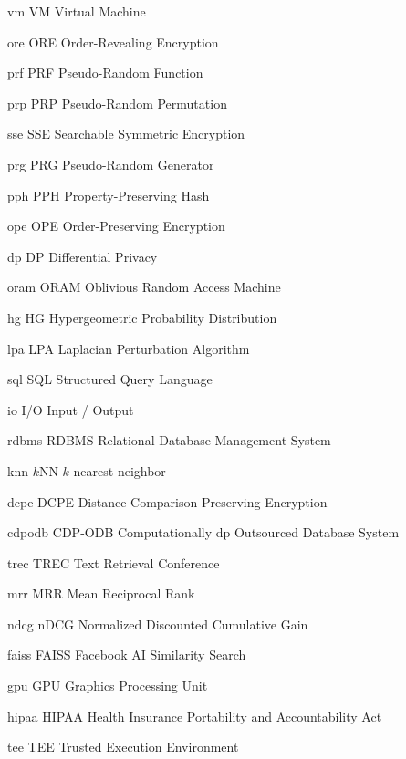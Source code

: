 
\newacronym%
	{vm}
	{VM}
	{Virtual Machine}

\newacronym%
	{ore}
	{ORE}
	{Order-Revealing Encryption}

\newacronym%
	{prf}
	{PRF}
	{Pseudo-Random Function}

\newacronym%
	{prp}
	{PRP}
	{Pseudo-Random Permutation}

\newacronym%
	{sse}
	{SSE}
	{Searchable Symmetric Encryption}

\newacronym%
	{prg}
	{PRG}
	{Pseudo-Random Generator}

\newacronym%
	{pph}
	{PPH}
	{Property-Preserving Hash}

\newacronym%
	{ope}
	{OPE}
	{Order-Preserving Encryption}

\newacronym%
	{dp}
	{DP}
	{Differential Privacy}

\newacronym%
	{oram}
	{ORAM}
	{Oblivious Random Access Machine}

\newacronym%
	{hg}
	{HG}
	{Hypergeometric Probability Distribution}

\newacronym%
	{lpa}
	{LPA}
	{Laplacian Perturbation Algorithm}

\newacronym%
	{sql}
	{SQL}
	{Structured Query Language}

\newacronym%
	{io}
	{I/O}
	{Input / Output}

\newacronym%
	{rdbms}
	{RDBMS}
	{Relational Database Management System}

\newacronym%
	{knn}
	{\ensuremath{k}NN}
	{$k$-nearest-neighbor}

\newacronym%
	{dcpe}
	{DCPE}
	{Distance Comparison Preserving Encryption}

\newacronym%
	{cdpodb}
	{CDP-ODB}
	{Computationally \acrshort{dp} Outsourced Database System}

\newacronym%
	{trec}
	{TREC}
	{Text Retrieval Conference}

\newacronym%
	{mrr}
	{MRR}
	{Mean Reciprocal Rank}

\newacronym%
	{ndcg}
	{nDCG}
	{Normalized Discounted Cumulative Gain}

\newacronym%
	{faiss}
	{FAISS}
	{Facebook AI Similarity Search}

\newacronym%
	{gpu}
	{GPU}
	{Graphics Processing Unit}

\newacronym%
	{hipaa}
	{HIPAA}
	{Health Insurance Portability and Accountability Act}

\newacronym%
	{tee}
	{TEE}
	{Trusted Execution Environment}

